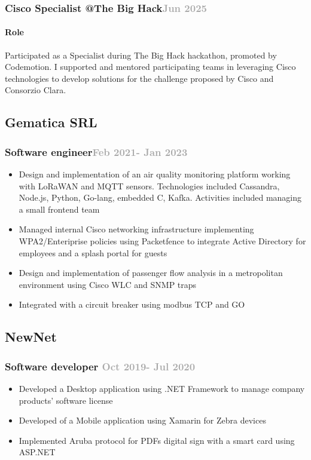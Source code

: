 \documentclass[11pt,a4paper]{article}
\begin{document}
  \subsubsection{Cisco Specialist @The Big Hack\hfill \textcolor{darkgray}{\small{Jun 2025}}}
  \paragraph{Role}
    Participated as a Specialist during The Big Hack hackathon, promoted by Codemotion. I supported and mentored participating teams in leveraging Cisco technologies to develop solutions for the challenge proposed by Cisco and Consorzio Clara.


  \subsection{Gematica SRL}
  \subsubsection{Software engineer\hfill \textcolor{darkgray}{\small{Feb 2021- Jan 2023}}}
  \begin{itemize}
    \item Design and implementation of an air quality monitoring platform working with LoRaWAN and MQTT sensors. Technologies included Cassandra, Node.js, Python, Go-lang, embedded C, Kafka. Activities included managing a small frontend team
    \item Managed internal Cisco networking infrastructure implementing WPA2/Enteriprise policies using Packetfence to integrate Active Directory for employees and a splash portal for guests
    \item Design and implementation of passenger flow analysis in a metropolitan environment using Cisco WLC and SNMP traps
    \item Integrated with a circuit breaker using modbus TCP and GO
  \end{itemize}

  \subsection{NewNet}
  \subsubsection{Software developer \hfill \textcolor{darkgray}{\small{Oct 2019- Jul 2020}}}
  \begin{itemize}
    \item Developed a Desktop application using .NET Framework to manage company products'  software license
    \item Developed of a Mobile application using Xamarin for Zebra devices
    \item Implemented Aruba protocol for PDFs digital sign with a smart card using ASP.NET
  \end{itemize}
\end{document}
